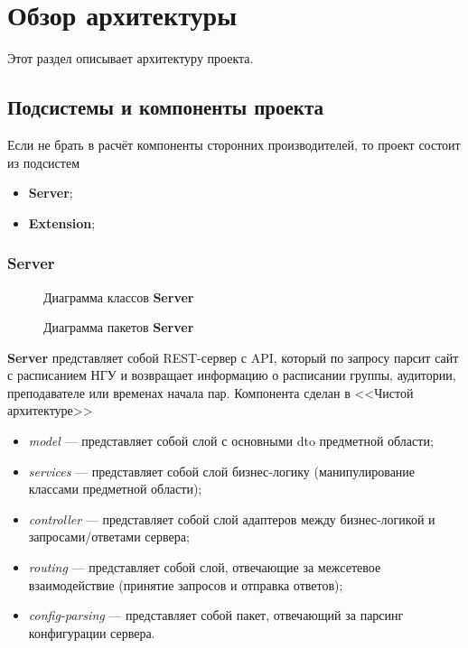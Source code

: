 \newcommand{\Server}{Server}
\newcommand{\Extension}{Extension}

\newcommand{\Serverbf}{\textbf{\Server}}
\newcommand{\Extensionbf}{\textbf{\Extension}}

\chapter{Обзор архитектуры}
	\label{chapter4}

	Этот раздел описывает архитектуру проекта.

	\section{Подсистемы и компоненты проекта}
		Если не брать в расчёт компоненты сторонних производителей, то проект состоит из подсистем
		
		\begin{itemize}
			\item \Serverbf{};
			
			\item \Extensionbf{};
		\end{itemize}
			
		\subsection{\Server{}}
			\begin{figure}[H]
				\centering
				\def\svgwidth{\columnwidth}
				
				\caption{Диаграмма классов \Serverbf}
			\end{figure}
		
			\begin{figure}[H]
				\centering
				\def\svgwidth{\columnwidth}
				
				\caption{Диаграмма пакетов \Serverbf}
			\end{figure}
		
			\Serverbf{} представляет собой REST-сервер с API, который по запросу парсит сайт с расписанием НГУ и возвращает информацию о расписании группы, аудитории, преподавателе или временах начала пар. Компонента сделан в <<Чистой архитектуре>>
			
			\begin{itemize}
				\item \textit{model} --- представляет собой слой с основными dto предметной области;
				
				\item \textit{services} --- представляет собой слой бизнес-логику (манипулирование классами предметной области);
				
				\item \textit{controller} --- представляет собой слой адаптеров между бизнес-логикой и запросами/ответами сервера;
				
				\item \textit{routing} --- представляет собой слой, отвечающие за межсетевое взаимодействие (принятие запросов и отправка ответов);
				
				\item \textit{config-parsing} --- представляет собой пакет, отвечающий за парсинг конфигурации сервера.
			\end{itemize}
